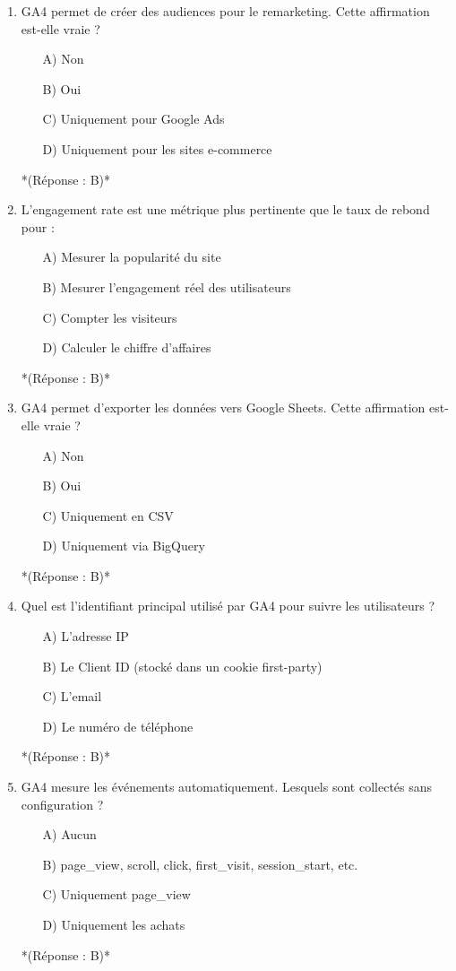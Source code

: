 \documentclass[12pt,a4paper,twoside]{report}
\begin{document}
\begin{enumerate}
    \item GA4 permet de créer des audiences pour le remarketing. Cette affirmation est-elle vraie ?
    \begin{itemize}
        \item[A)] Non
        \item[B)] Oui
        \item[C)] Uniquement pour Google Ads
        \item[D)] Uniquement pour les sites e-commerce
    \end{itemize}
    *(Réponse : B)*

    \item L'engagement rate est une métrique plus pertinente que le taux de rebond pour :
    \begin{itemize}
        \item[A)] Mesurer la popularité du site
        \item[B)] Mesurer l'engagement réel des utilisateurs
        \item[C)] Compter les visiteurs
        \item[D)] Calculer le chiffre d'affaires
    \end{itemize}
    *(Réponse : B)*

    \item GA4 permet d'exporter les données vers Google Sheets. Cette affirmation est-elle vraie ?
    \begin{itemize}
        \item[A)] Non
        \item[B)] Oui
        \item[C)] Uniquement en CSV
        \item[D)] Uniquement via BigQuery
    \end{itemize}
    *(Réponse : B)*

    \item Quel est l'identifiant principal utilisé par GA4 pour suivre les utilisateurs ?
    \begin{itemize}
        \item[A)] L'adresse IP
        \item[B)] Le Client ID (stocké dans un cookie first-party)
        \item[C)] L'email
        \item[D)] Le numéro de téléphone
    \end{itemize}
    *(Réponse : B)*

    \item GA4 mesure les événements automatiquement. Lesquels sont collectés sans configuration ?
    \begin{itemize}
        \item[A)] Aucun
        \item[B)] page\_view, scroll, click, first\_visit, session\_start, etc.
        \item[C)] Uniquement page\_view
        \item[D)] Uniquement les achats
    \end{itemize}
    *(Réponse : B)*


\end{enumerate}
\end{document}
